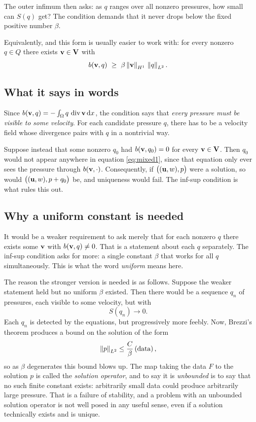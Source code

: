 \documentclass[11pt,a4paper]{article}
\newcommand{\Vsp}{\mathbf{V}}
\newcommand{\Qsp}{Q}
\begin{document}
The outer infimum then asks: as $q$ ranges over all nonzero pressures, how small
can $S(q)$ get? The condition demands that it never drops below the fixed
positive number $\beta$.

Equivalently, and this form is usually easier to work with: for every nonzero
$q \in \Qsp$ there exists $\bv \in \Vsp$ with
\begin{equation}\label{eq:infsup-equiv}
  b(\mathbf{v},q) \ \ge\ \beta \left\lVert \mathbf{v} \right\rVert_{H^{1}}\,\left\lVert q \right\rVert_{L^{2}} .
\end{equation}

\subsection{What it says in words}

Since $b(\mathbf{v},q) = -\int_\Omega q \,\operatorname{div} \mathbf{v} \,\mathrm{d}x$, the condition says that
\emph{every pressure must be visible to some velocity}. For each candidate
pressure $q$, there has to be a velocity field whose divergence pairs with $q$
in a nontrivial way.

Suppose instead that some nonzero $q_{0}$ had $b(\mathbf{v},q_{0}) = 0$ for every
$\bv \in \Vsp$. Then $q_{0}$ would not appear anywhere in equation
\eqref{eq:mixed1}, since that equation only ever sees the pressure through
$b(\mathbf{v},\cdot)$. Consequently, if $\big((\mathbf{u},w),p\big)$ were a solution, so would
$\big((\mathbf{u},w),p+q_{0}\big)$ be, and uniqueness would fail. The inf-sup condition
is what rules this out.

\subsection{Why a uniform constant is needed}

It would be a weaker requirement to ask merely that for each nonzero $q$ there
exists some $\mathbf{v}$ with $b(\mathbf{v},q) \neq 0$. That is a statement about each $q$
separately. The inf-sup condition asks for more: a single constant $\beta$ that
works for all $q$ simultaneously. This is what the word \emph{uniform} means
here.

The reason the stronger version is needed is as follows. Suppose the weaker
statement held but no uniform $\beta$ existed. Then there would be a sequence
$q_{n}$ of pressures, each visible to some velocity, but with
\[
  S(q_{n}) \longrightarrow 0 .
\]
Each $q_{n}$ is detected by the equations, but progressively more feebly. Now,
Brezzi's theorem produces a bound on the solution of the form
\[
  \left\lVert p \right\rVert_{L^{2}} \le \frac{C}{\beta}\left( \text{data} \right) ,
\]
so as $\beta$ degenerates this bound blows up. The map taking the data $F$ to
the solution $p$ is called the \emph{solution operator}, and to say it is
\emph{unbounded} is to say that no such finite constant exists: arbitrarily
small data could produce arbitrarily large pressure. That is a failure of
stability, and a problem with an unbounded solution operator is not well posed
in any useful sense, even if a solution technically exists and is unique.
\end{document}
